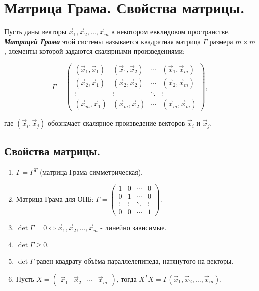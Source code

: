 \section{
    Матрица Грама. Свойства матрицы.
}

\begin{definition}
    Пусть даны векторы \( \vec{x}_1, \vec{x}_2, \dots, \vec{x}_m \) в некотором евклидовом пространстве. \textit{\textbf{Матрицей Грама}} этой системы называется квадратная матрица \( \Gamma \) размера \( m \times m \), элементы которой задаются скалярными произведениями:

    \[
    \Gamma = \begin{pmatrix}
    (\vec{x}_1, \vec{x}_1) & (\vec{x}_1, \vec{x}_2) & \cdots & (\vec{x}_1, \vec{x}_m) \\
    (\vec{x}_2, \vec{x}_1) & (\vec{x}_2, \vec{x}_2) & \cdots & (\vec{x}_2, \vec{x}_m) \\
    \vdots     & \vdots     & \ddots & \vdots     \\
    (\vec{x}_m, \vec{x}_1) & (\vec{x}_m, \vec{x}_2) & \cdots & (\vec{x}_m, \vec{x}_m)
    \end{pmatrix},
    \]
    
    где \( (\vec{x}_i, \vec{x}_j) \) обозначает скалярное произведение векторов \( \vec{x}_i \) и \( \vec{x}_j \).
\end{definition}


\subsection*{Свойства матрицы.}

\begin{enumerate}
    \item $\Gamma = \Gamma^T$ (матрица Грама симметрическая).
    \item Матрица Грама для ОНБ: $\Gamma = \begin{pmatrix}
    1 & 0 & \cdots & 0 \\
    0 & 1 & \cdots & 0 \\
    \vdots     & \vdots     & \ddots & \vdots     \\
    0 & 0 & \cdots & 1
    \end{pmatrix}$.

    \item $\det \Gamma = 0 \iff \vec{x}_1, \vec{x}_2, \dots, \vec{x}_m$ - линейно зависимые.
    \item $\det \Gamma \geq 0$.
    \item $\det \Gamma$ равен квадрату объёма параллелепипеда, натянутого на векторы.
    \item Пусть $X = \begin{pmatrix}
    \vec{x}_1 & \vec{x}_2 & \cdots & \vec{x}_m
    \end{pmatrix}$, тогда $X^TX = \Gamma(\vec{x}_1, \vec{x}_2, \ldots, \vec{x}_m).$
\end{enumerate}
